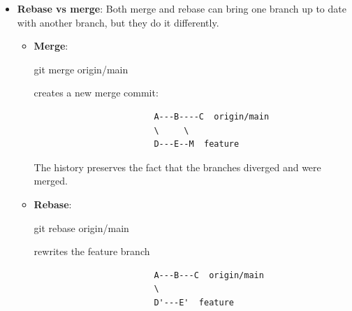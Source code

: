 \documentclass{report}
\begin{document}
\begin{itemize}
            \bigbreak \noindent 
            \begin{bashcode}
                git switch feature
                git rebase origin/main
            \end{bashcode}
            \bigbreak \noindent 
            Git rewrites your branch like this:
            \begin{verbatim}
                A---B---C  origin/main
                \
                D'---E'  feature
            \end{verbatim}
            \bigbreak \noindent 
            Your changes are replayed on top of the latest origin/main.
            \bigbreak \noindent 
            Notice the commits are now called $D^{\prime}$ and $E^{\prime}$, not $D$ and $E$. That is because rebasing creates new commits with new commit hashes.
        \item \textbf{Rebase vs merge}: Both merge and rebase can bring one branch up to date with another branch, but they do it differently.
            \begin{itemize}
                \item \textbf{Merge}:  
                    \bigbreak \noindent 
                    \begin{bashcode}
                        git merge origin/main
                    \end{bashcode}
                    \bigbreak \noindent 
                    creates a new merge commit:
                    \begin{verbatim}
                        A---B----C  origin/main
                        \     \
                        D---E--M  feature 
                    \end{verbatim}
                    \bigbreak \noindent 
                    The history preserves the fact that the branches diverged and were merged.
                \item \textbf{Rebase}:  
                    \bigbreak \noindent 
                    \begin{bashcode}
                        git rebase origin/main
                    \end{bashcode}
                    \bigbreak \noindent 
                    rewrites the feature branch
                    \begin{verbatim}
                        A---B---C  origin/main
                        \
                        D'---E'  feature 
                    \end{verbatim}
                    \bigbreak \noindent 

\end{itemize}
\end{itemize}
\end{document}
